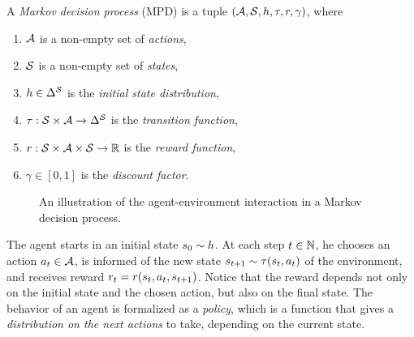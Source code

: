 \begin{defi}\label{def:mdp}
	A \emph{Markov decision process} (MPD) is a tuple $ \left( \mathcal{A}, \mathcal{S}, h, \tau, r, \gamma \right) $, where \begin{enumerate}[ ]
		\item $ \mathcal{A} $ is a non-empty set of \emph{actions},
		\item $ \mathcal{S} $ is a non-empty set of \emph{states},
		\item $ h \in \Delta^{\mathcal{S}} $ is the \emph{initial state distribution},
		\item $ \tau: \mathcal{S} \times \mathcal{A} \to \Delta^{\mathcal{S}} $ is the \emph{transition function},
		\item $ r: \mathcal{S} \times \mathcal{A} \times \mathcal{S} \to \mathbb{R} $ is the \emph{reward function},
		\item $ \gamma \in \left[ 0,1 \right] $ is the \emph{discount factor}.
	\end{enumerate}
\end{defi}

\begin{figure*}[t!]
	\centering
	\caption{An illustration of the agent-environment interaction in a Markov decision process.}
\end{figure*}

The agent starts in an initial state $ s_0 \sim h $.
At each step $ t \in \mathbb{N} $, he chooses an action $ a_t \in \mathcal{A} $, is informed of the new state $ s_{t+1} \sim \tau\!\left(s_{t}, a_t\right) $ of the environment, and receives reward $ r_t = r\!\left(s_{t}, a_t, s_{t+1}\right) $.
Notice that the reward depends not only on the initial state and the chosen action, but also on the final state.
The behavior of an agent is formalized as a \emph{policy}, which is a function that gives a \emph{distribution on the next actions} to take, depending on the current state.

